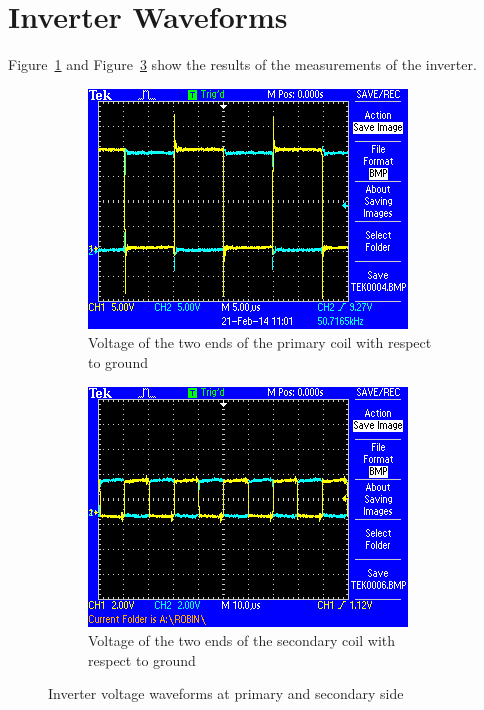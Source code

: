 \documentclass[11pt,titlepage]{report}
\begin{document}
\section{Inverter Waveforms}
Figure~\ref{fig:app-osc-coil-primary} and Figure~\ref{fig:app-osc-coil-secondary} show the results of the measurements of the inverter.
\label{app:waveforms}
\begin{figure}[H]
	\begin{center}
		\begin{subfigure}[h]{0.48\textwidth}
			\includegraphics[width=\textwidth]{resource/osc-coil-primary.png}
			\caption{Voltage of the two ends of the primary coil with respect to ground}
			\label{fig:app-osc-coil-primary}
		\end{subfigure}
		\quad
		\begin{subfigure}[h]{0.48\textwidth}
			\includegraphics[width=\textwidth]{resource/osc-coil-secondary.png}
			\caption{Voltage of the two ends of the secondary coil with respect to ground}
			\label{fig:app-osc-coil-secondary}
		\end{subfigure}
	\end{center}
	\caption{Inverter voltage waveforms at primary and secondary side}
\end{figure}
\end{document}
